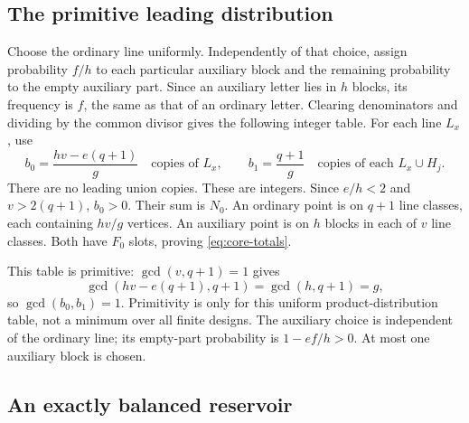 \subsection{The primitive leading distribution}

Choose the ordinary line uniformly. Independently of that choice, assign probability $f/h$ to each particular auxiliary block and the remaining probability to the empty auxiliary part. Since an auxiliary letter lies in $h$ blocks, its frequency is $f$, the same as that of an ordinary letter. Clearing denominators and dividing by the common divisor gives the following integer table.
For each line $L_x$, use
\begin{equation}\label{eq:core-table}
 b_0=\frac{hv-e(q+1)}g\quad\text{copies of }L_x,
 \qquad b_1=\frac{q+1}g\quad\text{copies of each }L_x\cup H_j.
\end{equation}
There are no leading union copies. These are integers. Since $e/h<2$ and $v>2(q+1)$, $b_0>0$. Their sum is $N_0$. An ordinary point is on $q+1$ line classes, each containing $hv/g$ vertices. An auxiliary point is on $h$ blocks in each of $v$ line classes. Both have $F_0$ slots, proving \eqref{eq:core-totals}.

This table is primitive: $\gcd(v,q+1)=1$ gives
\[
 \gcd(hv-e(q+1),q+1)=\gcd(h,q+1)=g,
\]
so $\gcd(b_0,b_1)=1$. Primitivity is only for this uniform product-distribution table, not a minimum over all finite designs. The auxiliary choice is independent of the ordinary line; its empty-part probability is $1-ef/h>0$. At most one auxiliary block is chosen.

\subsection{An exactly balanced reservoir}

